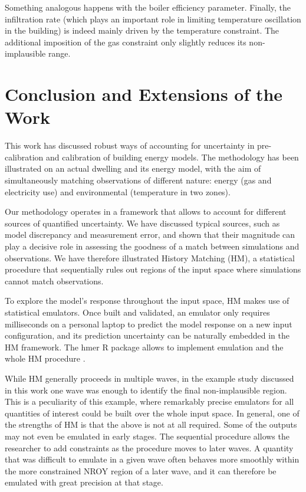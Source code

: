 \documentclass[preprint,12pt, sort&compress]{elsarticle}
\begin{document}
Something analogous happens with the boiler efficiency parameter. Finally, the infiltration rate (which plays an important role in limiting temperature oscillation in the building) is indeed mainly driven by the temperature constraint. The additional imposition of the gas constraint only slightly reduces its non-implausible range.



\section{Conclusion and Extensions of the Work}
\label{Sec_Discussion}

This work has discussed robust ways of accounting for uncertainty in pre-calibration and calibration of building energy models. The methodology has been illustrated on an actual dwelling and its energy model, with the aim of simultaneously matching observations of different nature: energy (gas and electricity use) and environmental (temperature in two zones). 

Our methodology operates in a framework that allows to account for different sources of quantified uncertainty. We have discussed typical sources, such as model discrepancy and measurement error, and shown that their magnitude can play a decisive role in assessing the goodness of a match between simulations and observations. We have therefore illustrated History Matching (HM), a statistical procedure that sequentially rules out regions of the input space where simulations cannot match observations. 

To explore the model’s response throughout the input space, HM makes use of statistical emulators. Once built and validated, an emulator only requires milliseconds on a personal laptop to predict the model response on a new input configuration, and its prediction uncertainty can be naturally embedded in the HM framework. The hmer R package allows to implement emulation and the whole HM procedure \cite{hmer}.

While HM generally proceeds in multiple waves, in the example study discussed in this work one wave was enough to identify the final non-implausible region. This is a peculiarity of this example, where remarkably precise emulators for all quantities of interest could be built over the whole input space. In general, one of the strengths of HM is that the above is not at all required. Some of the outputs may not even be emulated in early stages. The sequential procedure allows the researcher to add constraints as the procedure moves to later waves. A quantity that was difficult to emulate in a given wave often behaves more smoothly within the more constrained NROY region of a later wave, and it can therefore be emulated with great precision at that stage. 
\end{document}
